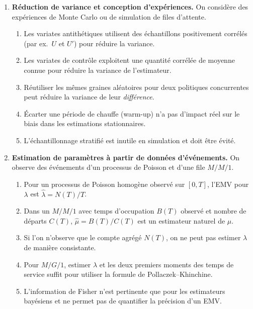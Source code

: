 \documentclass[a4paper,11pt]{article}
\begin{document}
\begin{enumerate}
\item \textbf{Réduction de variance et conception d'expériences.} On considère des expériences de Monte Carlo ou de simulation de files d'attente.
  \begin{enumerate}
    \item Les variates antithétiques utilisent des échantillons positivement corrélés (par ex.\ $U$ et $U'$) pour réduire la variance.
    \item Les variates de contrôle exploitent une quantité corrélée de moyenne connue pour réduire la variance de l'estimateur.
    \item Réutiliser les mêmes graines aléatoires pour deux politiques concurrentes peut réduire la variance de leur \emph{différence}.
    \item Écarter une période de chauffe (warm-up) n'a pas d'impact réel sur le biais dans les estimations stationnaires.
    \item L'échantillonnage stratifié est inutile en simulation et doit être évité.
  \end{enumerate}

\item \textbf{Estimation de paramètres à partir de données d'événements.} On observe des événements d'un processus de Poisson et d'une file $M/M/1$.
  \begin{enumerate}
    \item Pour un processus de Poisson homogène observé sur $[0,T]$, l'EMV pour $\lambda$ est $\hat\lambda = N(T)/T$.
    \item Dans un $M/M/1$ avec temps d'occupation $B(T)$ observé et nombre de départs $C(T)$, $\hat\mu = B(T)/C(T)$ est un estimateur naturel de $\mu$.
    \item Si l'on n'observe que le compte agrégé $N(T)$, on ne peut pas estimer $\lambda$ de manière consistante.
    \item Pour $M/G/1$, estimer $\lambda$ et les deux premiers moments des temps de service suffit pour utiliser la formule de Pollaczek--Khinchine.
    \item L'information de Fisher n'est pertinente que pour les estimateurs bayésiens et ne permet pas de quantifier la précision d'un EMV.
  \end{enumerate}


\end{enumerate}
\end{document}
